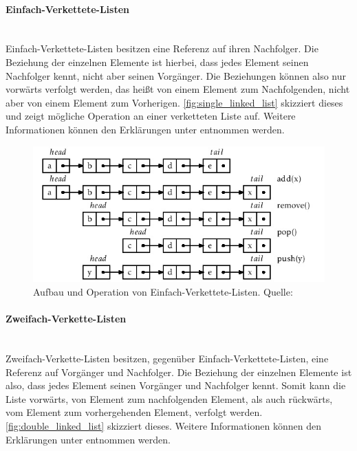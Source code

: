 \documentclass[a4paper]{article}
\begin{document}
	\paragraph{Einfach-Verkettete-Listen}\mbox{} \\
	
	Einfach-Verkettete-Listen besitzen eine Referenz auf ihren Nachfolger.
	Die Beziehung der einzelnen Elemente ist hierbei, dass jedes Element
	seinen Nachfolger kennt, nicht aber seinen Vorgänger. Die Beziehungen
	können also nur vorwärts verfolgt werden, das heißt von einem Element
	zum Nachfolgenden, nicht aber von einem Element zum Vorherigen.
	\autoref{fig:single_linked_list} skizziert dieses und zeigt mögliche
	Operation an einer verketteten Liste auf. Weitere Informationen können
	den Erklärungen unter \cite{SLList} entnommen werden.
	
	\begin{figure}[H] 
		\includegraphics[width=\linewidth]{../Bilder/single_linked_list.jpg}
		\caption
		{
			Aufbau und Operation von Einfach-Verkettete-Listen.
			Quelle: \cite{SLList}
		}
		\label{fig:single_linked_list}
	\end{figure}	
	
	\paragraph{Zweifach-Verkette-Listen}\mbox{} \\
	
	Zweifach-Verkette-Listen besitzen, gegenüber Einfach-Verkettete-Listen,
	eine Referenz auf Vorgänger und Nachfolger. Die Beziehung der einzelnen
	Elemente ist also, dass jedes Element seinen Vorgänger und Nachfolger
	kennt. Somit kann die Liste vorwärts, von Element zum nachfolgenden
	Element, als auch rückwärts, vom Element zum vorhergehenden Element,
	verfolgt werden. \autoref{fig:double_linked_list} skizziert dieses.
	Weitere Informationen können den Erklärungen unter \cite{DLList} entnommen
	werden.
	
\end{document}
